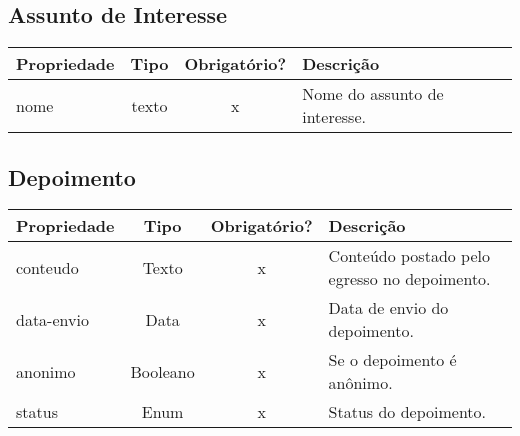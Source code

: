 \subsection{Assunto de Interesse} \label{Assunto-de-Interesse}
\begin{table}[h!]
	\footnotesize
	\begin{tabular}{|p{2.6cm}|c|c|p{7.8cm}|}   \hline \rowcolor[rgb]{0.8,0.8,0.8}
	
		
 		\textbf{Propriedade} & \textbf{Tipo} & \textbf{Obrigatório?} & \centerline{\textbf{Descrição}} \\\hline
 		                            
		nome & texto & x & Nome do assunto de interesse. \\\hline
		
		
		
	\end{tabular}	
\end{table}


\subsection{Depoimento} \label{Depoimento}
\begin{table}[h!]
	\footnotesize
	\begin{tabular}{|p{2.6cm}|c|c|p{7.8cm}|}   \hline \rowcolor[rgb]{0.8,0.8,0.8}
	
		
		\textbf{Propriedade} & \textbf{Tipo} & \textbf{Obrigatório?} & \centerline{\textbf{Descrição}} \\\hline  	
 		                           
		conteudo & Texto & x & Conteúdo postado pelo egresso no depoimento. \\\hline
		  
  		data-envio & Data & x & Data de envio do depoimento. \\\hline 
  		
		anonimo & Booleano & x & Se o depoimento é anônimo. \\\hline  
		
		status & Enum & x & Status do depoimento. \\\hline 		
  		
	\end{tabular}	
\end{table}


